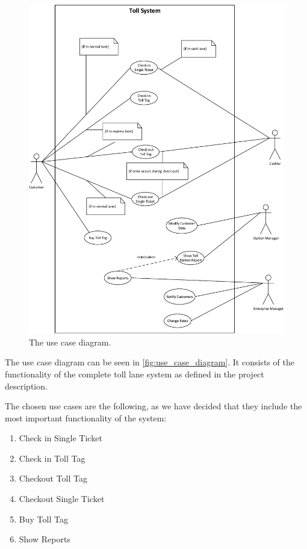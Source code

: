 \begin{figure}
\centering
\includegraphics[width=1\textwidth]{img/use_case_diagram/use_case_diagram}
\vspace{-3cm}
\caption{The use case diagram.}
\label{fig:use_case_diagram}
\end{figure}

The use case diagram can be seen in \autoref{fig:use_case_diagram}. It consists of the functionality of the complete toll lane system as defined in the project description.



The chosen use cases are the following, as we have decided that they include the most important functionality of the system:
\begin{enumerate}
\item Check in Single Ticket
\item Check in Toll Tag
\item Checkout Toll Tag
\item Checkout Single Ticket
\item Buy Toll Tag
\item Show Reports
\end{enumerate}

